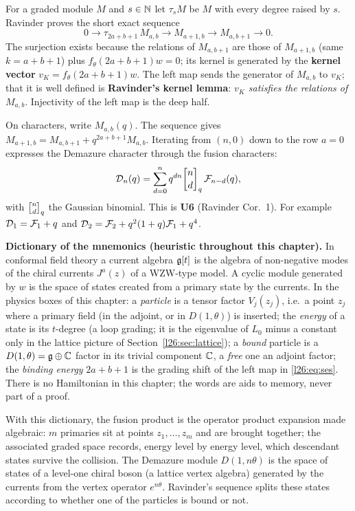 For a graded module $M$ and $s\in{\mathbb{N}}$ let $\tau_sM$ be $M$ with every degree raised by $s$. Ravinder proves the short exact
sequence
\begin{equation}\label{l26:eq:ses}
0\longrightarrow \tau_{2a+b+1}\,M_{a,b}\longrightarrow M_{a+1,b}\longrightarrow M_{a,b+1}\longrightarrow 0 .
\end{equation}
The surjection exists because the relations of $M_{a,b+1}$ are those of $M_{a+1,b}$ (same $k=a+b+1$) plus
$f_\theta(2a+b+1)w=0$; its kernel is generated by the \textbf{kernel vector} $v_K=f_\theta(2a+b+1)w$. The left map sends the
generator of $M_{a,b}$ to $v_K$; that it is well defined is \textbf{Ravinder's kernel lemma}: \emph{$v_K$ satisfies the relations
of $M_{a,b}$}. Injectivity of the left map is the deep half.

On characters, write $M_{a,b}(q)$. The sequence gives $M_{a+1,b}=M_{a,b+1}+q^{2a+b+1}M_{a,b}$. Iterating from $(n,0)$
down to the row $a=0$ expresses the Demazure character through the fusion characters:
\begin{equation}\label{l26:eq:mixed}
\ltwentysixD_n(q)=\sum_{d=0}^{n}q^{dn}\ltwentysixqb nd\,\ltwentysixF_{n-d}(q),
\end{equation}
with $\ltwentysixqb nd$ the Gaussian binomial. This is \textbf{U6} (Ravinder Cor.~1). For example
$\mathcal D_1=\mathcal F_1+q$ and $\mathcal D_2=\mathcal F_2+q^2(1+q)\mathcal F_1+q^4$.

\begin{physics}
\textbf{Dictionary of the mnemonics (heuristic throughout this chapter).} In conformal field theory a current algebra
$\mathfrak g[t]$ is the algebra of non-negative modes of the chiral currents $J^a(z)$ of a WZW-type model. A cyclic module
generated by $w$ is the space of states created from a primary state by the currents. In the physics boxes of this chapter:
a \emph{particle} is a tensor factor $V_j(z_j)$, i.e.\ a point $z_j$ where a primary field (in the adjoint, or in $D(1,\theta)$) is
inserted; the \emph{energy} of a state is its $t$-degree (a loop grading; it is the eigenvalue of $L_0$ minus a constant only in
the lattice picture of Section~\ref{l26:sec:lattice}); a \emph{bound} particle is a $D(1,\theta)=\mathfrak g\oplus{\mathbb{C}}$ factor in its
trivial component ${\mathbb{C}}$, a \emph{free} one an adjoint factor; the \emph{binding energy} $2a+b+1$ is the grading shift of the left map
in \eqref{l26:eq:ses}. There is no Hamiltonian in this chapter; the words are aids to memory, never part of a proof.

With this dictionary, the fusion product is the operator product expansion made algebraic: $m$ primaries sit at points
$z_1,\dots,z_m$ and are brought together; the associated graded space records, energy level by energy level, which
descendant states survive the collision. The Demazure module $D(1,n\theta)$ is the space of states of a level-one chiral boson
(a lattice vertex algebra) generated by the currents from the vertex operator $e^{n\theta}$. Ravinder's sequence splits these
states according to whether one of the particles is bound or not.
\end{physics}

